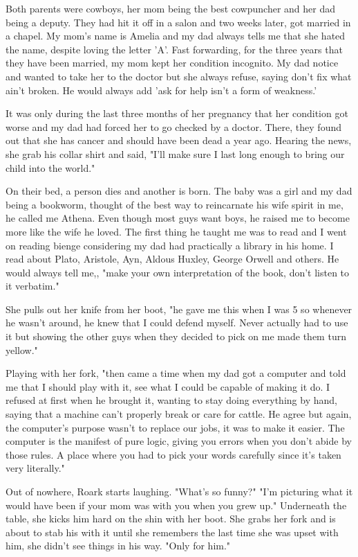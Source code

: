         Both parents were cowboys, her mom being the best cowpuncher and her dad being a deputy. They had hit it off in a salon and two weeks
    later, got married in a chapel. My mom's name is Amelia and my dad always tells me that she hated the name, despite loving the letter 'A'. 
    Fast forwarding, for the three years that they have been married, my mom kept her condition incognito. My dad notice and wanted to take
    her to the doctor but she always refuse, saying don't fix what ain't broken. He would always add 'ask for help isn't a form of weakness.'

        It was only during the last three months of her pregnancy that her condition got worse and my dad had forced her to go checked by a 
    doctor. There, they found out that she has cancer and should have been dead a year ago. Hearing the news, she grab his collar shirt and
    said, "I'll make sure I last long enough to bring our child into the world."

        On their bed, a person dies and another is born. The baby was a girl and my dad being a bookworm, thought of the best way to reincarnate
    his wife spirit in me, he called me Athena. Even though most guys want boys, he raised me to become more like the wife he loved. The first
    thing he taught me was to read and I went on reading bienge considering my dad had practically a library in his home. I read about Plato,
    Aristole, Ayn, Aldous Huxley, George Orwell and others. He would always tell me,, "make your own interpretation of the book, don't listen
    to it verbatim."

        She pulls out her knife from her boot, "he gave me this when I was 5 so whenever he wasn't around, he knew that I could defend myself.
    Never actually had to use it but showing the other guys when they decided to pick on me made them turn yellow."

        Playing with her fork, "then came a time when my dad got a computer and told me that I should play with it, see what I could be capable
    of making it do. I refused at first when he brought it, wanting to stay doing everything by hand, saying that a machine can't properly break
    or care for cattle. He agree but again, the computer's purpose wasn't to replace our jobs, it was to make it easier. The computer is the 
    manifest of pure logic, giving you errors when you don't abide by those rules. A place where you had to pick your words carefully since
    it's taken very literally."

        Out of nowhere, Roark starts laughing. "What's so funny?" "I'm picturing what it would have been if your mom was with you when you grew 
    up." Underneath the table, she kicks him hard on the shin with her boot. She grabs her fork and is about to stab his with it until she
    remembers the last time she was upset with him, she didn't see things in his way. "Only for him."

